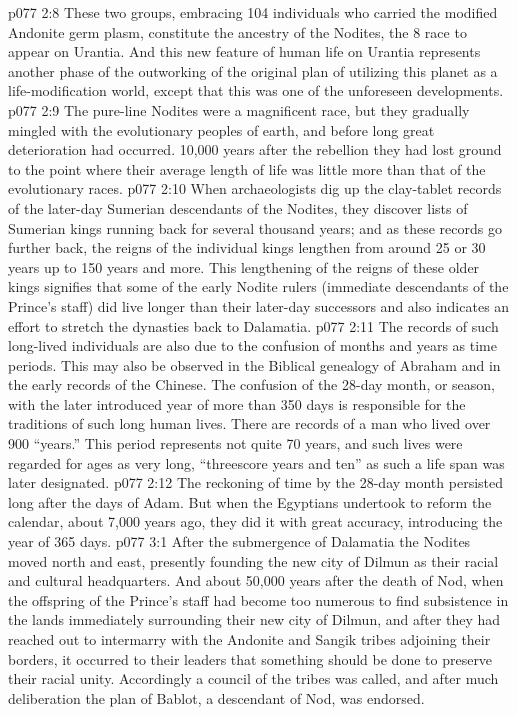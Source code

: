 \vs p077 2:8 These two groups, embracing 104 individuals who carried the modified Andonite germ plasm, constitute the ancestry of the Nodites, the 8 race to appear on Urantia. And this new feature of human life on Urantia represents another phase of the outworking of the original plan of utilizing this planet as a life\hyp{}modification world, except that this was one of the unforeseen developments.
\vs p077 2:9 \pc The pure\hyp{}line Nodites were a magnificent race, but they gradually mingled with the evolutionary peoples of earth, and before long great deterioration had occurred. 10,000 years after the rebellion they had lost ground to the point where their average length of life was little more than that of the evolutionary races.
\vs p077 2:10 When archaeologists dig up the clay\hyp{}tablet records of the later\hyp{}day Sumerian descendants of the Nodites, they discover lists of Sumerian kings running back for several thousand years; and as these records go further back, the reigns of the individual kings lengthen from around 25 or 30 years up to 150 years and more. This lengthening of the reigns of these older kings signifies that some of the early Nodite rulers (immediate descendants of the Prince’s staff) did live longer than their later\hyp{}day successors and also indicates an effort to stretch the dynasties back to Dalamatia.
\vs p077 2:11 The records of such long\hyp{}lived individuals are also due to the confusion of months and years as time periods. This may also be observed in the Biblical genealogy of Abraham and in the early records of the Chinese. The confusion of the 28\hyp{}day month, or season, with the later introduced year of more than 350 days is responsible for the traditions of such long human lives. There are records of a man who lived over 900 “years.” This period represents not quite 70 years, and such lives were regarded for ages as very long, “threescore years and ten” as such a life span was later designated.
\vs p077 2:12 The reckoning of time by the 28\hyp{}day month persisted long after the days of Adam. But when the Egyptians undertook to reform the calendar, about 7,000 years ago, they did it with great accuracy, introducing the year of 365 days.
\vs p077 3:1 After the submergence of Dalamatia the Nodites moved north and east, presently founding the new city of Dilmun as their racial and cultural headquarters. And about 50,000 years after the death of Nod, when the offspring of the Prince’s staff had become too numerous to find subsistence in the lands immediately surrounding their new city of Dilmun, and after they had reached out to intermarry with the Andonite and Sangik tribes adjoining their borders, it occurred to their leaders that something should be done to preserve their racial unity. Accordingly a council of the tribes was called, and after much deliberation the plan of Bablot, a descendant of Nod, was endorsed.
